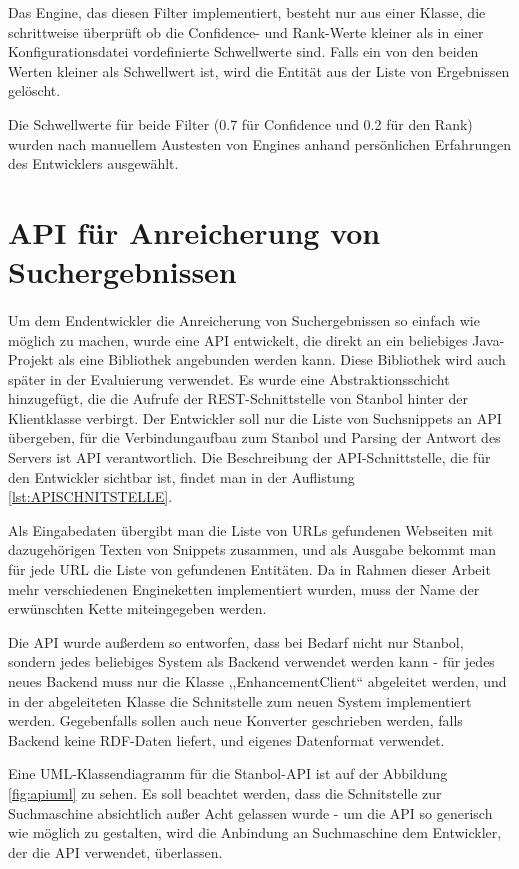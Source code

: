 Das Engine, das diesen Filter implementiert, besteht nur aus einer Klasse, die schrittweise überprüft ob die Confidence- und Rank-Werte kleiner als in einer Konfigurationsdatei vordefinierte Schwellwerte sind. Falls ein von den beiden Werten kleiner als Schwellwert ist, wird die Entität aus der Liste von Ergebnissen gelöscht.

Die Schwellwerte für beide Filter (0.7 für Confidence und 0.2 für den Rank) wurden nach manuellem Austesten von Engines anhand persönlichen Erfahrungen des Entwicklers ausgewählt.

\section{API f{\"{u}}r Anreicherung von Suchergebnissen}
\paragraph{}
Um dem Endentwickler die Anreicherung von Suchergebnissen so einfach wie möglich zu machen, wurde eine API entwickelt, die direkt an ein beliebiges Java-Projekt als eine Bibliothek angebunden werden kann. Diese Bibliothek wird auch später in der Evaluierung verwendet. Es wurde eine Abstraktionsschicht hinzugefügt, die die Aufrufe der REST-Schnittstelle von Stanbol hinter der Klientklasse verbirgt. Der Entwickler soll nur die Liste von Suchsnippets an API übergeben, für die Verbindungaufbau zum Stanbol und Parsing der Antwort des Servers ist API verantwortlich. Die Beschreibung der API-Schnittstelle, die für den Entwickler sichtbar ist, findet man in der Auflistung \ref{lst:APISCHNITSTELLE}. 

Als Eingabedaten übergibt man die Liste von URLs gefundenen Webseiten mit dazugehörigen Texten von Snippets zusammen, und als Ausgabe bekommt man für jede URL die Liste von gefundenen Entitäten. Da in Rahmen dieser Arbeit mehr verschiedenen Engineketten implementiert wurden, muss der Name der erwünschten Kette miteingegeben werden.

Die API wurde außerdem so entworfen, dass bei Bedarf nicht nur Stanbol, sondern jedes beliebiges System als Backend verwendet werden kann - für jedes neues Backend muss nur die Klasse ,,EnhancementClient`` abgeleitet werden, und in der abgeleiteten Klasse die Schnitstelle zum neuen System implementiert werden. Gegebenfalls sollen auch neue Konverter geschrieben werden, falls Backend keine RDF-Daten liefert, und eigenes Datenformat verwendet.

Eine UML-Klassendiagramm für die Stanbol-API ist auf der Abbildung \ref{fig:apiuml} zu sehen. Es soll beachtet werden, dass die Schnitstelle zur Suchmaschine absichtlich außer Acht gelassen wurde - um die API so generisch wie möglich zu gestalten, wird die Anbindung an Suchmaschine dem Entwickler, der die API verwendet, überlassen. 

